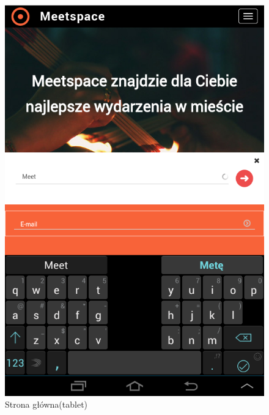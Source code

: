     \begin{figure}
      \centering
      \includegraphics[scale=0.5]{images/home_tablet.png}
      \caption{Strona główna(tablet)}
    \end{figure}


\clearpage
